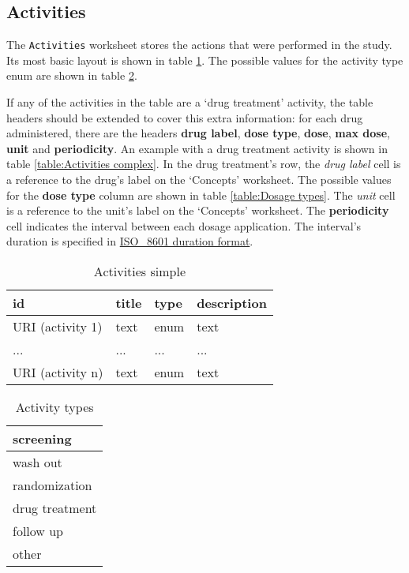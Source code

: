 \documentclass[a4paper,10pt]{article}
\begin{document}
\subsection{Activities}
The \texttt{Activities} worksheet stores the actions that were performed in the study. Its most basic layout is shown in table \ref{table:Activities simple}. The possible values for the activity type enum are shown in table \ref{table:Activity types}.

If any of the activities in the table are a `drug treatment' activity, the table headers should be extended to cover this extra information: for each drug administered, there are the headers \textbf{drug label}, \textbf{dose type}, \textbf{dose}, \textbf{max dose}, \textbf{unit} and \textbf{periodicity}. An example with a drug treatment activity is shown in table \ref{table:Activities complex}. In the drug treatment's row, the \textit{drug label} cell is a reference to the drug's label on the `Concepts' worksheet. The possible values for the \textbf{dose type} column are shown in table \ref{table:Dosage types}. The \textit{unit} cell is a reference to the unit's label on the `Concepts' worksheet. The \textbf{periodicity} cell indicates the interval between each dosage application. The interval's duration is specified in \href{https://en.wikipedia.org/wiki/ISO_8601#Durations}{ISO\_8601 duration format}.

\begin{table}[h]
  \centering
  \caption{Activities simple}
  \small
  \label{table:Activities simple}
  \begin{tabular}{|l|l|l|l|}
    \hline
    \textbf{id} & \textbf{title} & \textbf{type} & \textbf{description} \\ \hline
    URI (activity 1) & text           & enum & text \\ \hline
    ...              & ...            & ...  & ...  \\ \hline
    URI (activity n) & text           & enum & text \\ \hline
  \end{tabular}
\end{table}

\begin{table}[h]
  \centering
  \caption{Activity types}
  \small
  \label{table:Activity types}
  \begin{tabular}{|l|}
    \hline
    screening \\ \hline
    wash out \\ \hline
    randomization \\ \hline
    drug treatment \\ \hline
    follow up \\ \hline
    other \\ \hline
  \end{tabular}
\end{table}
\end{document}
